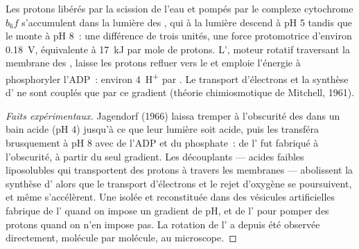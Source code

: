 \begin{theorem}\label{thm:b1:photosynthesis:chemiosmosis}
Les protons libérés par la scission de l'eau et pompés par le complexe
cytochrome $b_6f$ s'accumulent dans la lumière des , qui à la
lumière descend à pH 5 tandis que le  monte à pH 8~: une
différence de trois unités, une force protomotrice d'environ
\qty{0.18}{V}, équivalente à \qty{17}{kJ} par mole de protons. L'\emph{}, moteur rotatif traversant la membrane des , laisse
les protons refluer vers le  et emploie l'énergie à phosphoryler
l'ADP~: environ \qty{4}{H^+} par . Le transport d'électrons et la
synthèse d' ne sont couplés que par ce gradient (théorie
chimiosmotique de Mitchell, 1961).
\end{theorem}
\begin{proof}[Faits expérimentaux]
Jagendorf (1966) laissa tremper à l'obscurité des  dans un
bain acide (pH 4) jusqu'à ce que leur lumière soit acide, puis les
transféra brusquement à pH 8 avec de l'ADP et du phosphate~: de l'
fut fabriqué à l'obscurité, à partir du seul gradient. Les découplants
--- acides faibles liposolubles qui transportent des protons à travers
les membranes --- abolissent la synthèse d' alors que le transport
d'électrons et le rejet d'oxygène se poursuivent, et même s'accélèrent.
Une  isolée et reconstituée dans des vésicules artificielles
fabrique de l' quand on impose un gradient de pH, et  de
l' pour pomper des protons quand on n'en impose pas. La rotation de
l' a depuis été observée directement, molécule par molécule, au
microscope.
\end{proof}

